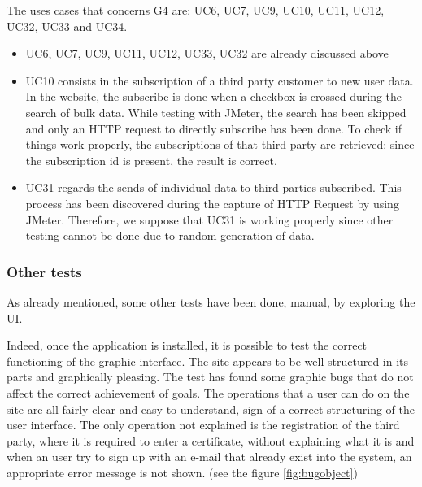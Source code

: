 The uses cases that concerns G4 are: UC6, UC7, UC9, UC10, UC11, UC12, UC32, UC33 and UC34. \\

\begin{itemize}
\item 
UC6, UC7, UC9, UC11, UC12, UC33, UC32 are already discussed above

\item 
UC10 consists in the subscription of a third party customer to new user data. \\
In the website, the subscribe is done when a checkbox is crossed during the search of bulk data. 
While testing with JMeter, the search has been skipped and only an HTTP request to directly subscribe has been done.
To check if things work properly, the subscriptions of that third party are retrieved: since the subscription id is present, the
result is correct.

\item 
UC31 regards the sends of individual data to third parties subscribed. This process has been discovered during the capture of HTTP Request by using JMeter. Therefore, we suppose that UC31 is working properly since other testing cannot be done due to random generation of data.

\end{itemize}

\subsubsection{Other tests}
As already mentioned, some other tests have been done, manual, by exploring the UI. \\

\par
Indeed, once the application is installed, it is possible to test the correct functioning of the graphic interface. 
The site appears to be well structured in its parts and graphically pleasing. 
The test has found some graphic bugs that do not affect the correct achievement of goals. 
The operations that a user can do on the site are all fairly clear and easy to understand, sign of a correct structuring of the user
interface.
The only operation not explained is the registration of the third party, where it is required to enter a certificate, without explaining what
it is and when an user try to sign up with an e-mail that already exist into the system, an appropriate error message is not shown. (see the figure \ref{fig:bugobject})\\

